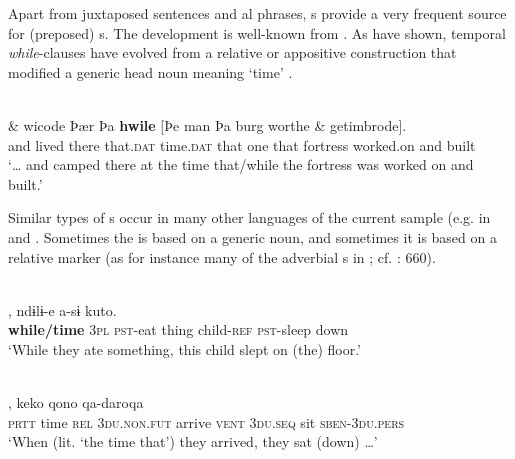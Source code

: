 \documentclass[output=paper]{langsci/langscibook}
\begin{document}
Apart from juxtaposed sentences and al phrases, s provide a very frequent source for (preposed) s. The development is well-known from . As \citet{HopperTraugott2003} have shown, temporal \textit{while}-clauses have evolved from a relative or appositive construction that modified a generic head noun meaning ‘time’ .

\ea\label{ex:diessel:9}
\\
\gll   \& wicode    Þær   Þa   \textbf{hwile}  [Þe   man  Þa   burg  worthe  \& getimbrode].\\
       and  lived   there   that.\textsc{dat}   time.\textsc{dat}  that   one  that   fortress  worked.on  and built\\
\glt `… and camped there at the time that/while the fortress was worked on and built.'
\z

Similar types of s occur in many other languages of the current sample (e.g. in   and  . Sometimes the  is based on a generic noun, and sometimes it is based on a relative marker (as for instance many of the adverbial s in ; cf. \citealt{Heath2005}: 660). 

\ea\label{ex:diessel:10}
\\
,   ndɨlɨ-e   a-sɨ   kuto.\\
        \textbf{while/time} \textsc{3pl}   \textsc{pst-}eat   thing   child-\textsc{ref}   \textsc{pst-}sleep   down\\
\glt   `While they ate something, this child slept on (the) floor.'
\z

\ea\label{ex:diessel:11}
\\
,  keko  qono  qa-daroqa\\
        \textsc{prtt}   time  \textsc{rel}   3\textsc{du.non.fut}  arrive  \textsc{vent}  \textsc{3du.seq}  sit  \textsc{sben-3du.pers}\\
\glt   `When (lit. `the time that’) they arrived, they sat (down) …'
\z
\end{document}
